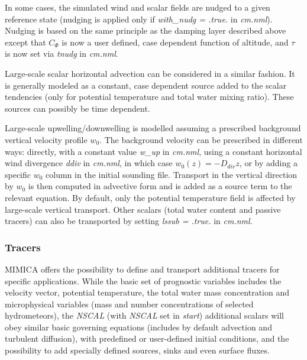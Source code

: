 \documentclass[12pt,A4,french]{article}
\begin{document}
In some cases, the simulated wind and scalar fields are nudged to a given reference state (nudging is applied only if {\it with\_nudg = .true.} in {\it cm.nml}). Nudging is based on the same principle as the damping layer described above except that $C_\Phi$ is now a user defined, case dependent function of altitude, and $\tau$ is now set via {\it tnudg} in {\it cm.nml}.

Large-scale scalar horizontal advection can be considered in a similar fashion. It is generally modeled as a constant, case dependent source added to the scalar tendencies (only for potential temperature and total water mixing ratio). These sources can possibly be time dependent. 

Large-scale upwelling/downwelling is modelled assuming a prescribed background vertical velocity profile $w_0$. The background velocity can be prescribed in different ways: directly, with a constant value {\it w\_up} in {\it cm.nml}, using a constant horizontal wind divergence {\it ddiv} in {\it cm.nml}, in which case $w_0\left(z\right) = -D_{div} z$, or by adding a specific $w_0$ column in the initial sounding file. Transport in the vertical direction by $w_0$ is then computed in advective form and is added as a source term to the relevant equation. By default, only the potential temperature field is affected by large-scale vertical transport. Other scalars (total water content and passive tracers) can also be transported by setting {\it lssub = .true.} in {\it cm.nml}.

\subsubsection{Tracers}

MIMICA offers the possibility to define and transport additional tracers for specific applications. While the basic set of prognostic variables includes the velocity vector, potential temperature, the total water mass concentration and microphysical variables (mass and number concentrations of selected hydrometeors), the {\it NSCAL} (with {\it NSCAL} set in {\it start}) additional scalars will obey similar basic governing equations (includes by default advection and turbulent diffusion), with predefined or user-defined initial conditions, and the possibility to add specially defined sources, sinks and even surface fluxes. 
\end{document}
